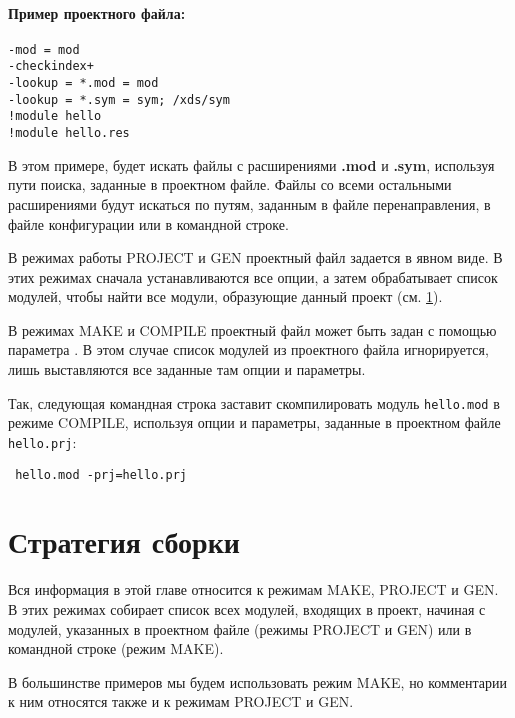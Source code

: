 \paragraph{Пример проектного файла:}
\begin{verbatim}
-mod = mod
-checkindex+
-lookup = *.mod = mod
-lookup = *.sym = sym; /xds/sym
!module hello
!module hello.res
\end{verbatim}

В этом примере, \xds{} будет искать файлы с расширениями
{\bf.mod} и {\bf.sym}, используя пути поиска, заданные в проектном файле.
Файлы со всеми остальными расширениями будут искаться по путям,
заданным в файле  перенаправления, в файле конфигурации или в 
командной строке.

В режимах работы PROJECT и GEN проектный файл задается в явном виде.
В этих режимах сначала устанавливаются все опции, а затем
\xds{} обрабатывает список модулей, чтобы найти все модули, образующие
данный проект (см. \ref{xc:make}).

В режимах MAKE и COMPILE проектный файл может быть задан с помощью
параметра . В этом случае список модулей из проектного файла
игнорируется, лишь выставляются все заданные там опции и параметры.

Так, следующая командная строка заставит \xds{}
скомпилировать модуль {\tt hello.mod} в режиме COMPILE,
используя опции и параметры, заданные в проектном файле
{\tt hello.prj}:
\begin{flushleft} \tt
  \xc{} hello.mod -prj=hello.prj
\end{flushleft}

\section{Стратегия сборки}\label{xc:make}

Вся информация в этой главе относится к режимам
MAKE, PROJECT и GEN. 
В этих режимах \xds{} собирает список всех модулей, входящих в проект,
начиная с модулей, указанных в проектном файле
(режимы PROJECT и GEN) или в командной строке (режим MAKE).

В большинстве примеров мы будем использовать режим MAKE,
но комментарии к ним относятся также и к режимам PROJECT и GEN.

